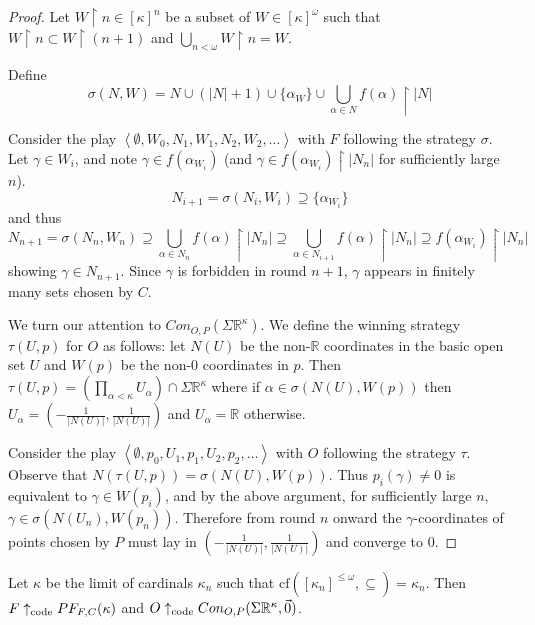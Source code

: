 \begin{proof}
Let $W\restriction n \in [\kappa]^n$ be a subset of $W\in[\kappa]^\omega$ such that $W\restriction n \subset W \restriction (n+1)$ and $\bigcup_{n<\omega} W\restriction n = W$.

Define \[\sigma(N,W) = N \cup (|N|+1) \cup \{\alpha_W\} \cup \bigcup_{\alpha \in N} f(\alpha) \restriction |N|\]

Consider the play $\left<\emptyset,W_0,N_1,W_1,N_2,W_2,\dots\right>$ with $F$ following the strategy $\sigma$. Let $\gamma \in W_i$, and note $\gamma \in f(\alpha_{W_i})$ (and $\gamma \in f(\alpha_{W_i})\restriction |N_n|$ for sufficiently large $n$). \[N_{i+1} = \sigma(N_i,W_i) \supseteq \{\alpha_{W_i}\}\] and thus \[N_{n+1} = \sigma(N_n,W_n) \supseteq \bigcup_{\alpha \in N_n} f(\alpha) \restriction |N_n| \supseteq \bigcup_{\alpha \in N_{i+1}} f(\alpha) \restriction |N_n| \supseteq f(\alpha_{W_i}) \restriction |N_n|\] showing $\gamma \in N_{n+1}$. Since $\gamma$ is forbidden in round $n+1$, $\gamma$ appears in finitely many sets chosen by $C$.

We turn our attention to $Con_{O,P}(\Sigma\mathbb{R}^\kappa)$. We define the winning strategy $\tau(U,p)$ for $O$ as follows: let $N(U)$ be the non-$\mathbb{R}$ coordinates in the basic open set $U$ and $W(p)$ be the non-$0$ coordinates in $p$. Then $\tau(U,p) = \left(\prod_{\alpha<\kappa} U_\alpha\right) \cap \Sigma\mathbb{R}^\kappa$ where if $\alpha \in \sigma(N(U),W(p))$ then $U_\alpha = (-\frac{1}{|N(U)|},\frac{1}{|N(U)|})$ and $U_\alpha=\mathbb{R}$ otherwise.

Consider the play $\left<\emptyset,p_0,U_1,p_1,U_2,p_2,\dots\right>$ with $O$ following the strategy $\tau$. Observe that $N(\tau(U,p))=\sigma(N(U),W(p))$. Thus $p_i(\gamma)\not=0$ is equivalent to $\gamma \in W(p_i)$, and by the above argument, for sufficiently large $n$, $\gamma \in \sigma(N(U_n),W(p_n))$. Therefore from round $n$ onward the $\gamma$-coordinates of points chosen by $P$ must lay in $(-\frac{1}{|N(U)|},\frac{1}{|N(U)|})$ and converge to $0$.
\end{proof}

\begin{theorem}
Let $\kappa$ be the limit of cardinals $\kappa_n$ such that $\textrm{cf}([\kappa_n]^{\leq\omega},\subseteq)=\kappa_n$. Then $F \uparrow_{\text{code}} PF_{F,C}(\kappa)$ and $O \uparrow_{\text{code}} Con_{O,P}(\Sigma\mathbb{R}^{\kappa},\vec{0})$.
\end{theorem}

